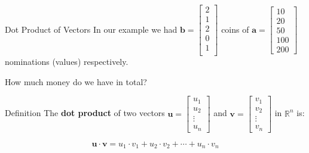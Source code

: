 \documentclass{beamer}
\begin{document}
\begin{frame}{Dot Product of Vectors}
In our example we had $\mathbf{b} = \begin{bmatrix}
2 \\1 \\2 \\0 \\1 \\
\end{bmatrix}$ coins of  $\mathbf{a} = \begin{bmatrix}
10 \\ 20 \\ 50 \\ 100 \\ 200
\end{bmatrix}$ nominations (values) respectively.

\pause How much money do we have in total?

\pause   \begin{block}{Definition}
    The \textbf{dot product} of two vectors \( \mathbf{u} = \begin{bmatrix} u_1 \\ u_2 \\ \vdots \\ u_n \end{bmatrix} \) and \( \mathbf{v} = \begin{bmatrix} v_1 \\ v_2 \\ \vdots \\ v_n \end{bmatrix} \) in \( \mathbb{R}^n \) is:

    \[
    \mathbf{u} \cdot \mathbf{v} = u_1 \cdot v_1 + u_2 \cdot v_2 + \cdots + u_n \cdot v_n
    \]
  \end{block}

\end{frame}
\end{document}
